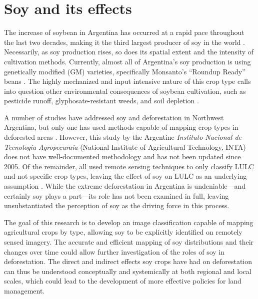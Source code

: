 \section*{Soy and its effects}

The increase of soybean in Argentina has occurred at a rapid pace throughout the last two decades, making it the third largest producer of soy in the world \autocite{us-foreign-agri2013world}. Necessarily, as soy production rises, so does its spatial extent and the intensity of cultivation methods. Currently, almost all of Argentina’s soy production is using genetically modified (GM) varieties, specifically Monsanto’s “Roundup Ready” beans \autocite{greenpeace-inte2005the-expanding}. The highly mechanized and input intensive nature of this crop type calls into question other environmental consequences of soybean cultivation, such as pesticide runoff, glyphosate-resistant weeds, and soil depletion \autocite{pengue2005transgenic}.

A number of studies have addressed soy and deforestation in Northwest Argentina, but only one has used methods capable of mapping crop types in deforested areas \autocite{volante2005analisis}. However, this study by the Argentine \textit{Instituto Nacional de Tecnología Agropecuraia} (National Institute of Agricultural Technology, INTA) does not have well-documented methodology and has not been updated since 2005. Of the remainder, all used remote sensing techniques to only classify LULC and not specific crop types, leaving the effect of soy on LULC as an underlying assumption \autocites{grau2005agriculture}{grau2005globalization}{grau2008balancing}{boletta2006assessing}{gasparri2009deforestation}. While the extreme deforestation in Argentina is undeniable---and certainly soy plays a part---its role has not been examined in full, leaving unsubstantiated the perception of soy as the driving force in this process.

The goal of this research is to develop an image classification capable of mapping agricultural crops by type, allowing soy to be explicitly identified on remotely sensed imagery. The accurate and efficient mapping of soy distributions and their changes over time could allow further investigation of the roles of soy in deforestation. The direct and indirect effects soy crops have had on deforestation can thus be understood conceptually and systemically at both regional and local scales, which could lead to the development of more effective policies for land management.
